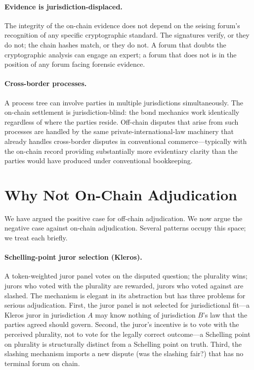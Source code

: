 \documentclass[11pt,a4paper]{article}
\theoremstyle{remark}
\begin{document}
\paragraph{Evidence is jurisdiction-displaced.}
The integrity of the on-chain evidence does not depend on the
seising forum's recognition of any specific cryptographic
standard. The signatures verify, or they do not; the chain hashes
match, or they do not. A forum that doubts the cryptographic
analysis can engage an expert; a forum that does not is in the
position of any forum facing forensic evidence.

\paragraph{Cross-border processes.}
A process tree can involve parties in multiple jurisdictions
simultaneously. The on-chain settlement is jurisdiction-blind:
the bond mechanics work identically regardless of where the
parties reside. Off-chain disputes that arise from such processes
are handled by the same private-international-law machinery that
already handles cross-border disputes in conventional
commerce---typically with the on-chain record providing
substantially more evidentiary clarity than the parties would
have produced under conventional bookkeeping.

\section{Why Not On-Chain Adjudication}
\label{sec:against-on-chain}

We have argued the positive case for off-chain adjudication. We
now argue the negative case against on-chain adjudication.
Several patterns occupy this space; we treat each briefly.

\paragraph{Schelling-point juror selection (Kleros).}
A token-weighted juror panel votes on the disputed question; the
plurality wins; jurors who voted with the plurality are rewarded,
jurors who voted against are slashed. The mechanism is elegant
in its abstraction but has three problems for serious adjudication.
First, the juror panel is not selected for jurisdictional
fit---a Kleros juror in jurisdiction $A$ may know nothing of
jurisdiction $B$'s law that the parties agreed should govern.
Second, the juror's incentive is to vote with the perceived
plurality, not to vote for the legally correct outcome---a
Schelling point on plurality is structurally distinct from a
Schelling point on truth. Third, the slashing mechanism imports a
new dispute (was the slashing fair?) that has no terminal forum
on chain.
\end{document}
